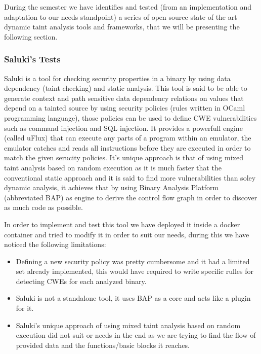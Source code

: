 \documentclass[12pt,a4paper,english,onecolumn]{IEEEtran}
\begin{document}
During the semester we have identifies and tested (from an implementation and adaptation to our needs standpoint) a series of open source state of the art dynamic taint analysis tools and frameworks, that we will be presenting the following section.

\subsubsection{Saluki's Tests}

Saluki \cite{saluki} is a tool for checking security properties in a binary by using data dependency (taint checking) and static analysis. This tool is said to be able to generate context and path sensitive data dependency relations on values that depend on a tainted source by using security policies (rules written in OCaml programming language), those policies can be used to define CWE vulnerabilities such as command injection and SQL injection. It provides a powerfull engine (called uFlux) that can execute any parts of a program within an emulator, the emulator catches and reads all instructions before they are executed in order to match the given serucity policies.
It's unique approach is that of using mixed taint analysis based on random execution as it is much faster that the conventional static approach and it is said to find more vulnerabilities than soley dynamic analysis, it achieves that by using Binary Analysis Platform (abbreviated BAP) \cite{bap_repository} as engine to derive the control flow graph in order to discover as much code as possible.

In order to implement and test this tool we have deployed it inside a docker container and tried to modify it in order to suit our needs, during this we have noticed the following limitations:
\begin{itemize}
    \item Defining a new security policy was pretty cumbersome and it had a limited set already implemented, this would have required to write specific rulles for detecting CWEs for each analyzed binary.
    \item Saluki is not a standalone tool, it uses BAP as a core and acts like a plugin for it.
    \item Saluki's unique approach of using mixed taint analysis based on random execution did not suit or needs in the end as we are trying to find the flow of provided data and the functions/basic blocks it reaches.
\end{itemize}
\end{document}
